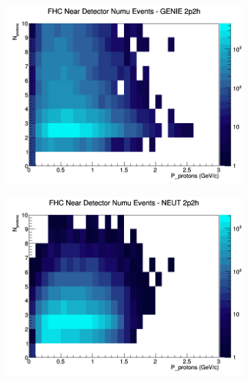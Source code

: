 \documentclass[12pt]{article}
\begin{document}
\begin{figure}[h]
\centering
\begin{subfigure}[b]{0.32\textwidth}
\includegraphics[width=\linewidth]{N_P/nominal/protons/2p2h_FHC_ND_numu_N_P_GENIE.png}
\end{subfigure}
\begin{subfigure}[b]{0.32\textwidth}
\includegraphics[width=\linewidth]{N_P/nominal/protons/2p2h_FHC_ND_numu_N_P_NEUT.png}
\end{subfigure}
\begin{subfigure}[b]{0.32\textwidth}

\end{subfigure}
\end{figure}
\end{document}
